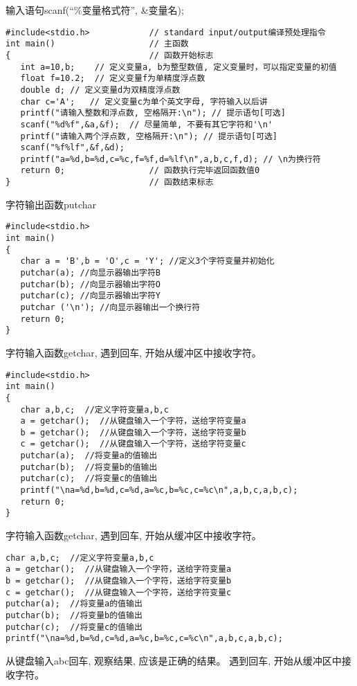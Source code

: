 \begin{frame}[fragile]{输入语句scanf(``\%变量格式符'', \&变量名);}
\begin{lstlisting}
#include<stdio.h>            // standard input/output编译预处理指令
int main()                   // 主函数
{                            // 函数开始标志
   int a=10,b;    // 定义变量a, b为整型数值, 定义变量时，可以指定变量的初值
   float f=10.2;  // 定义变量f为单精度浮点数
   double d; // 定义变量d为双精度浮点数
   char c='A';   // 定义变量c为单个英文字母, 字符输入以后讲
   printf("请输入整数和浮点数, 空格隔开:\n"); // 提示语句[可选]
   scanf("%d%f",&a,&f);  // 尽量简单, 不要有其它字符和'\n'
   printf("请输入两个浮点数, 空格隔开:\n"); // 提示语句[可选]
   scanf("%f%lf",&f,&d);
   printf("a=%d,b=%d,c=%c,f=%f,d=%lf\n",a,b,c,f,d); // \n为换行符
   return 0;                 // 函数执行完毕返回函数值0
}                            // 函数结束标志
\end{lstlisting}
\end{frame}

\begin{frame}[fragile]{字符输出函数putchar}
\begin{lstlisting}
#include<stdio.h>
int main()
{
   char a = 'B',b = 'O',c = 'Y'; //定义3个字符变量并初始化
   putchar(a); //向显示器输出字符B
   putchar(b); //向显示器输出字符O
   putchar(c); //向显示器输出字符Y
   putchar ('\n'); //向显示器输出一个换行符
   return 0;
}
\end{lstlisting}
\end{frame}

\begin{frame}[fragile]{字符输入函数getchar, 遇到回车, 开始从缓冲区中接收字符。}
\vspace{-0.4cm}
\begin{lstlisting}
#include<stdio.h>
int main()
{
   char a,b,c;  //定义字符变量a,b,c
   a = getchar();  //从键盘输入一个字符，送给字符变量a
   b = getchar();  //从键盘输入一个字符，送给字符变量b
   c = getchar();  //从键盘输入一个字符，送给字符变量c
   putchar(a);  //将变量a的值输出
   putchar(b);  //将变量b的值输出 
   putchar(c);  //将变量c的值输出
   printf("\na=%d,b=%d,c=%d,a=%c,b=%c,c=%c\n",a,b,c,a,b,c);
   return 0;
}
\end{lstlisting}
\end{frame}

\begin{frame}[fragile]{\small 字符输入函数getchar, 遇到回车, 开始从缓冲区中接收字符。}
\begin{lstlisting}
char a,b,c;  //定义字符变量a,b,c
a = getchar();  //从键盘输入一个字符，送给字符变量a
b = getchar();  //从键盘输入一个字符，送给字符变量b
c = getchar();  //从键盘输入一个字符，送给字符变量c
putchar(a);  //将变量a的值输出
putchar(b);  //将变量b的值输出 
putchar(c);  //将变量c的值输出
printf("\na=%d,b=%d,c=%d,a=%c,b=%c,c=%c\n",a,b,c,a,b,c);
\end{lstlisting}
从键盘输入abc回车, 观察结果, 应该是正确的结果。
遇到回车, 开始从缓冲区中接收字符。
\end{frame}

